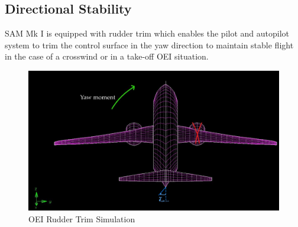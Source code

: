 \subsection{Directional Stability}
SAM Mk I is equipped with rudder trim which enables the pilot and autopilot system to trim the control surface in the yaw direction to maintain stable flight in the case of a crosswind or in a take-off OEI situation.
\begin{figure}[!h]
    \centering
    \includegraphics[width=\textwidth]{Photos/stab/oei.jpg}
    \caption{OEI Rudder Trim Simulation}
    \label{fig:OEI}
\end{figure}



